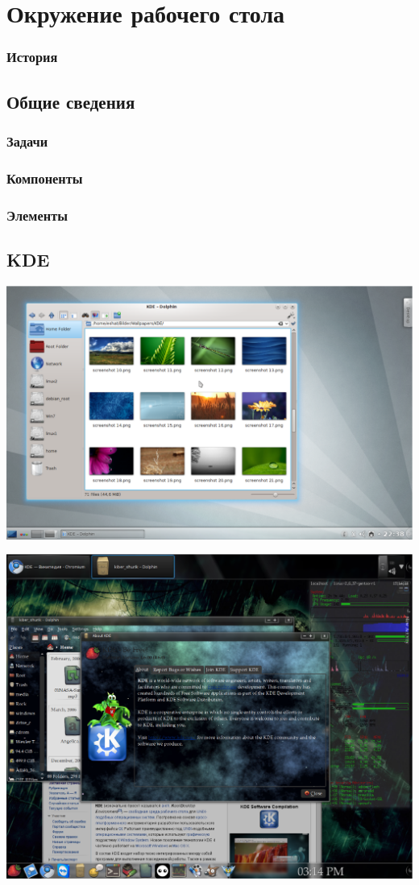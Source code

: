 \section{Окружение рабочего стола}
\subsubsection{История}
\subsection{Общие сведения}
\subsubsection{Задачи}
\subsubsection{Компоненты}
\subsubsection{Элементы}
\subsection{KDE}
\includegraphics[scale=0.38]{base/Software/KDE1.eps}

\includegraphics[scale=0.38]{base/Software/KDE2.eps}
